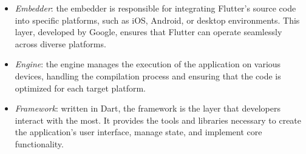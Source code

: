 \begin{itemize}
    \item \textit{Embedder}: the embedder is responsible for integrating Flutter's source code into specific platforms, such as iOS, Android, or desktop environments. 
        This layer, developed by Google, ensures that Flutter can operate seamlessly across diverse platforms.
    \item \textit{Engine}: the engine manages the execution of the application on various devices, handling the compilation process and ensuring that the code is optimized for each target platform.
    \item \textit{Framework}: written in Dart, the framework is the layer that developers interact with the most. 
        It provides the tools and libraries necessary to create the application's user interface, manage state, and implement core functionality.
\end{itemize}